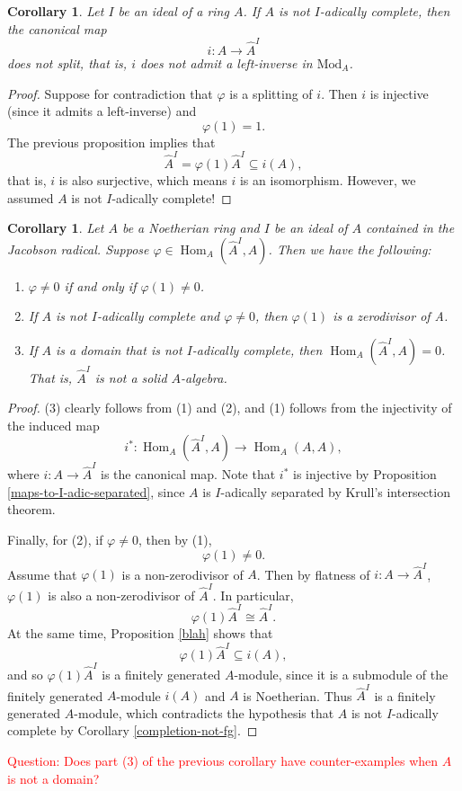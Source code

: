 \documentclass[11pt]{amsart}
\DeclareMathOperator{\Hom}{Hom}
\theoremstyle{plain}
\newtheorem{corollary}[subsubsection]{Corollary}
\theoremstyle{definition}
\theoremstyle{definition}
\theoremstyle{plain}
\theoremstyle{plain}
\numberwithin{equation}{subsubsection}
\numberwithin{equation}{subsubsection}
\begin{document}
{\vspace{2mm}}


\begin{corollary}
\label{completion-rarely-splits}
Let $I$ be an ideal of a ring $A$. If $A$ is not $I$-adically complete, then the canonical map
$$i: A \rightarrow \widehat{A}^I$$
does not split, that is, $i$ does not admit a left-inverse in $\textrm{Mod}_A$.
\end{corollary}

\begin{proof}
Suppose for contradiction that $\varphi$ is a splitting of $i$. Then $i$ is injective (since it admits a left-inverse) and
$$\varphi(1) = 1.$$
The previous proposition implies that
$$\widehat{A}^I = \varphi(1)\widehat{A}^I \subseteq i(A),$$
that is, $i$ is also surjective, which means $i$ is an isomorphism. However, we assumed $A$ is not $I$-adically complete!
\end{proof}

{\vspace{2mm}}

\begin{corollary}
\label{completions-usually-not-solid}
Let $A$ be a Noetherian ring and $I$ be an ideal of $A$ contained in the Jacobson radical. Suppose $\varphi \in \Hom_A(\widehat{A}^I, A)$. Then we have the following:
\begin{enumerate}
	\item $\varphi \neq 0$ if and only if $\varphi(1) \neq 0$.
	\item If $A$ is not $I$-adically complete and $\varphi \neq 0$, then $\varphi(1)$ is a zerodivisor of A.
	\item If $A$ is a domain that is not $I$-adically complete, then $\Hom_A(\widehat{A}^I, A) = 0$. That is, $\widehat{A}^I$ is not a solid $A$-algebra.
\end{enumerate}
\end{corollary}


\begin{proof}
(3) clearly follows from (1) and (2), and (1) follows from the injectivity of the induced map
$$i^*: \Hom_A(\widehat{A}^I, A) \rightarrow \Hom_A(A,A),$$
where $i: A \rightarrow \widehat{A}^I$ is the canonical map. Note that $i^*$ is injective by Proposition \ref{maps-to-I-adic-separated}, since $A$ is $I$-adically separated by Krull's intersection theorem. 

Finally, for (2), if $\varphi  \neq 0$, then by (1), 
$$\varphi(1) \neq 0.$$ 
Assume that $\varphi(1)$ is a non-zerodivisor of $A$. Then by flatness of $i: A \rightarrow \widehat{A}^I$, $\varphi(1)$ is also a non-zerodivisor of $\widehat{A}^I$. In particular,
$$\varphi(1)\widehat{A}^I \cong \widehat{A}^I.$$
At the same time, Proposition \ref{blah} shows that
$$\varphi(1)\widehat{A}^I \subseteq i(A),$$
and so $\varphi(1)\widehat{A}^I$ is a finitely generated $A$-module, since it is a submodule of the finitely generated $A$-module $i(A)$ and $A$ is Noetherian. Thus $\widehat{A}^I$ is a finitely generated $A$-module, which contradicts the hypothesis that $A$ is not $I$-adically complete by Corollary \ref{completion-not-fg}.
\end{proof}

\vspace{5mm}

\textcolor{red}{Question: Does part (3) of the previous corollary have counter-examples when $A$ is not a domain?}
\end{document}
